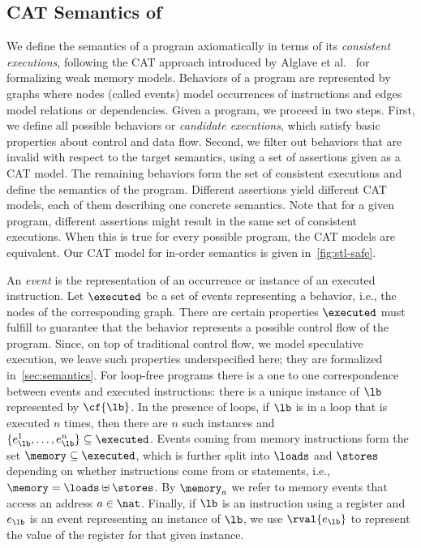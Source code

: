 \documentclass[conference]{IEEEtran}
\begin{document}
\subsection{CAT Semantics of \masm}
\label{sec:exec}

We define the semantics of a program axiomatically in terms of its \emph{consistent executions}, following the CAT approach introduced by Alglave et al.~\cite{cat,AlglaveMT14} for formalizing weak memory models. 
Behaviors of a program are represented by graphs where nodes (called events) model occurrences of instructions and edges model relations or dependencies.
Given a program, we proceed in two steps.
First, we define all possible behaviors or \emph{candidate executions}, which satisfy basic properties about control and data flow.
Second, we filter out behaviors that are invalid with respect to the target semantics, using a set of assertions given as a CAT model. 
The remaining behaviors form the set of consistent executions and define the semantics of the program.
Different assertions yield different CAT models, each of them describing one concrete semantics. Note that for a given program, different assertions might result in the same set of consistent executions. When this is true for every possible program, the CAT models are equivalent. 
Our CAT model for in-order semantics is given in~\autoref{fig:stl-safe}.

An \emph{event} is the representation of an occurrence or instance of an executed instruction.
Let $\executed$ be a set of events representing a behavior, i.e., the nodes of the corresponding graph.
There are certain properties $\executed$ must fulfill to guarantee that the behavior represents a possible control flow of the program.
Since, on top of traditional control flow, we model speculative execution, we leave such properties underspecified here; they are formalized in~\autoref{sec:semantics}.
For loop-free programs there is a one to one correspondence between events and executed instructions: there is a unique instance of $\lb$ represented by $\cf{\lb}$.
In the presence of loops, if $\lb$ is in a loop that is executed $n$ times, then there are $n$ such instances and $\{ e^1_\lb, \dots, e^n_\lb \} \subseteq \executed$.
Events coming from memory instructions form the set $\memory \subseteq \executed$, which is further split into $\loads$ and $\stores$ depending on whether instructions come from \load or \store statements, i.e., $\memory = \loads \uplus \stores$.
By $\memory_a$ we refer to memory events that access an address $a \in \nat$.
Finally, if $\lb$ is an instruction using a register and $e_\lb$ is an event representing an instance of $\lb$, we use $\rval{e_\lb}$ to represent the value of the register for that given instance.
\end{document}
